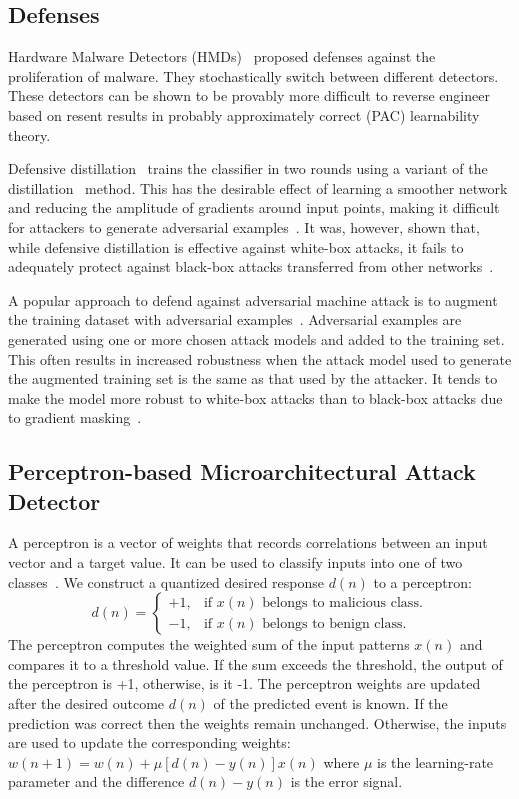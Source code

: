 \subsection{Defenses}

 Hardware Malware Detectors (HMDs)~\cite{RHMD2017} proposed defenses against the proliferation of malware. They stochastically switch between different detectors. These detectors can be shown to be provably more difficult to
reverse engineer based on resent results in probably approximately
correct (PAC) learnability theory. 



Defensive distillation~\cite{papernot2016distillation} trains the classifier in two rounds using a variant of the
distillation~\cite{hinton2015distilling} method. This has the desirable effect of learning a smoother network
and reducing the amplitude of gradients around input points, making it difficult for attackers to
generate adversarial examples~\cite{papernot2016distillation}. It was, however, shown that, while defensive
distillation is effective against white-box attacks, it fails to adequately protect against black-box
attacks transferred from other networks~\cite{Carlini2017}.

A popular approach to defend against adversarial machine attack is to augment the training dataset with adversarial examples~\cite{szegedy2014going, Goodfellow2015ADVexample, moosavidezfooli2016deepfool}. Adversarial examples are generated using one or more chosen attack models and added to the training
set. This often results in increased robustness when the attack model used to generate the augmented
training set is the same as that used by the attacker. It tends to make the model more robust to white-box attacks than to black-box attacks due to gradient masking~\cite{Papernot2016TowardsTS, tramer2020ensemble}.


\subsection{Perceptron-based Microarchitectural Attack Detector}
A perceptron is a vector of weights that records correlations between an input
vector and a target value. It can be used to classify inputs into one of two
classes~\cite{RosenblattPerceptron}. We construct a quantized desired response $d(n)$ to a perceptron:
\[
  d(n)=\begin{cases}
    +1, & \text{if $x(n)$ belongs to malicious class}.\\
    -1, & \text{if $x(n)$  belongs to benign class}.
  \end{cases}
\]
The perceptron computes the weighted sum of the input patterns $x(n)$ 
and compares it to a threshold value.
If the sum exceeds the threshold, the output of the perceptron is +1, otherwise, is it -1. 
The perceptron weights are updated after the desired outcome $d(n)$ of the predicted
event is known. If the prediction was correct then the weights remain unchanged. 
Otherwise, the inputs are used to update the corresponding weights:\\
$w(n+1)=w(n)+\mu[d(n)-y(n)]x(n)$
where $\mu$ is the learning-rate parameter and the difference $d(n)-y(n)$ is the 
error signal.

